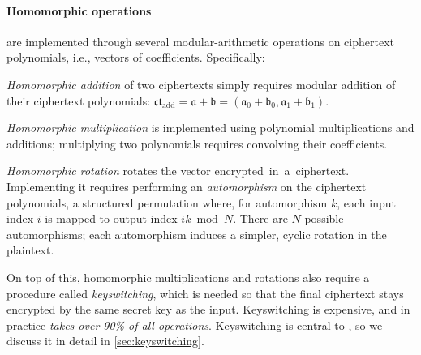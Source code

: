 \paragraph{Homomorphic operations} are implemented through several modular-arithmetic operations on ciphertext polynomials, i.e., vectors of coefficients. Specifically:
\begin{compactitem}
\item \emph{Homomorphic addition} of two ciphertexts simply requires modular addition of their ciphertext polynomials:
    $\mathfrak{ct}_{\textrm{add}} = \mathfrak{a} + \mathfrak{b} = (\mathfrak{a}_0+\mathfrak{b}_0, \mathfrak{a}_1+\mathfrak{b}_1)$.
\item \emph{Homomorphic multiplication} is implemented using polynomial multiplications and additions;
  multiplying two polynomials requires convolving their coefficients.
\item \emph{Homomorphic rotation} rotates the vector encrypted~in~a~ciphertext.
  Implementing it requires performing an \emph{automorphism} on the ciphertext polynomials,
  a structured permutation where, for automorphism $k$, each input index $i$ is mapped to output index $ik \bmod N$.
  There are $N$ possible automorphisms; each automorphism induces a simpler, cyclic rotation in the plaintext.

\end{compactitem}

\tblComputeBreakdown

On top of this, homomorphic multiplications and rotations also require a procedure called \emph{keyswitching},
which is needed so that the final ciphertext
stays encrypted by the same secret key as the input.
Keyswitching is expensive, and in practice \emph{takes over 90\% of all operations}.
Keyswitching is central to \name, so we discuss it in detail in \autoref{sec:keyswitching}.



